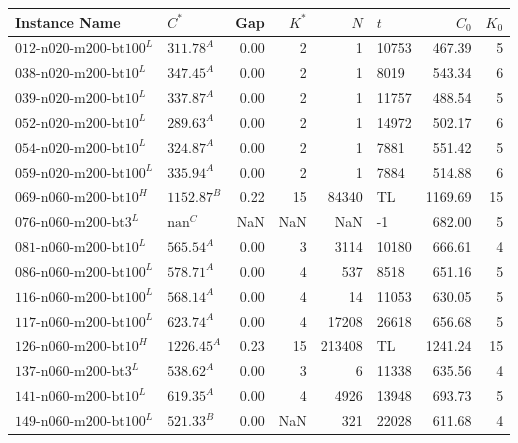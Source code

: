\begin{table}[ht]
	\small
	\centering
	\begin{tabular}{llrrrlrr}
		\toprule
		Instance Name                  & $C^*$              & Gap  & $K^*$ & $N$    & $t$   & $C_0$   & $K_0$ \\
		\midrule
		$\text{012-n020-m200-bt100}^L$ & $\text{311.78}^A$  & 0.00 & 2     & 1      & 10753 & 467.39  & 5     \\
		$\text{038-n020-m200-bt10}^L$  & $\text{347.45}^A$  & 0.00 & 2     & 1      & 8019  & 543.34  & 6     \\
		$\text{039-n020-m200-bt10}^L$  & $\text{337.87}^A$  & 0.00 & 2     & 1      & 11757 & 488.54  & 5     \\
		$\text{052-n020-m200-bt10}^L$  & $\text{289.63}^A$  & 0.00 & 2     & 1      & 14972 & 502.17  & 6     \\
		$\text{054-n020-m200-bt10}^L$  & $\text{324.87}^A$  & 0.00 & 2     & 1      & 7881  & 551.42  & 5     \\
		$\text{059-n020-m200-bt100}^L$ & $\text{335.94}^A$  & 0.00 & 2     & 1      & 7884  & 514.88  & 6     \\
		$\text{069-n060-m200-bt10}^H$  & $\text{1152.87}^B$ & 0.22 & 15    & 84340  & TL    & 1169.69 & 15    \\
		$\text{076-n060-m200-bt3}^L$   & $\text{nan}^C$     & NaN  & NaN   & NaN    & -1    & 682.00  & 5     \\
		$\text{081-n060-m200-bt10}^L$  & $\text{565.54}^A$  & 0.00 & 3     & 3114   & 10180 & 666.61  & 4     \\
		$\text{086-n060-m200-bt100}^L$ & $\text{578.71}^A$  & 0.00 & 4     & 537    & 8518  & 651.16  & 5     \\
		$\text{116-n060-m200-bt100}^L$ & $\text{568.14}^A$  & 0.00 & 4     & 14     & 11053 & 630.05  & 5     \\
		$\text{117-n060-m200-bt100}^L$ & $\text{623.74}^A$  & 0.00 & 4     & 17208  & 26618 & 656.68  & 5     \\
		$\text{126-n060-m200-bt10}^H$  & $\text{1226.45}^A$ & 0.23 & 15    & 213408 & TL    & 1241.24 & 15    \\
		$\text{137-n060-m200-bt3}^L$   & $\text{538.62}^A$  & 0.00 & 3     & 6      & 11338 & 635.56  & 4     \\
		$\text{141-n060-m200-bt10}^L$  & $\text{619.35}^A$  & 0.00 & 4     & 4926   & 13948 & 693.73  & 5     \\
		$\text{149-n060-m200-bt100}^L$ & $\text{521.33}^B$  & 0.00 & NaN   & 321    & 22028 & 611.68  & 4     \\

\end{tabular}
\end{table}
